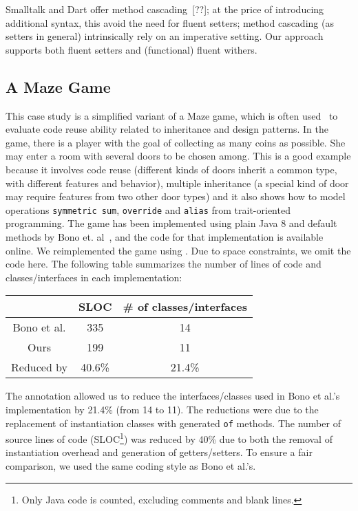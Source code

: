 
Smalltalk and Dart offer method cascading~[??];
at the price of introducing additional syntax,
this avoid the need for fluent setters;
method cascading (as setters in general) 
intrinsically rely  on an imperative setting.
Our approach supports both fluent setters and (functional) 
fluent withers.

\subsection{A Maze Game}
This case study is a simplified variant of a Maze game, which is often
used~\cite{gof,bono14}
to evaluate code reuse ability related to inheritance and design
patterns. In the game, there is a player with the goal of collecting
as many coins as possible. She may enter a room with several doors to
be chosen among. This is a good example because it involves code reuse
(different kinds of doors inherit a common type, with different
features and behavior), multiple inheritance (a special kind of door
may require features from two other door types) and it also shows how
to model operations \texttt{symmetric sum}, \texttt{override} and
\texttt{alias} from trait-oriented programming. The game has been
implemented using plain Java 8 and default methods by Bono
et. al~\cite{bono14}, and the code for that implementation is
available online. We reimplemented the game using \mixin. Due to space
constraints, we omit the code here. The following table summarizes
the number of lines of code and classes/interfaces in each implementation:

\vspace{5pt}
{\small
\begin{tabular}{ccc}
\hline \rowcolor[HTML]{C0C0C0}
            & SLOC   & \# of classes/interfaces \\ \hline
Bono et al. & 335    & 14                       \\
Ours        & 199    & 11                       \\
\rowcolor[HTML]{C0C0C0}
Reduced by  & 40.6\% & 21.4\%                   \\ \hline
\end{tabular}
}
\vspace{5pt}


\noindent The \mixin annotation allowed us to reduce the interfaces/classes used
in Bono et al.'s implementation by 21.4\% (from 14 to 11). The
reductions were due to the replacement of instantiation classes with
generated \texttt{of} methods. The number of source lines of code 
(SLOC\footnote{Only Java code is counted, excluding comments and blank lines. })
was reduced by 40\% due to both the removal of instantiation overhead and
generation of getters/setters. %
To ensure a fair comparison, we used the same coding style as Bono et al.'s.

